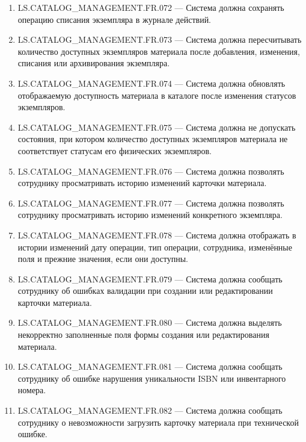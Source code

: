 \documentclass[12pt,a4paper]{article}
\begin{document}
\begin{enumerate}
		\item LS.CATALOG\_MANAGEMENT.FR.072 --- Система должна сохранять операцию списания
		экземпляра в журнале действий.
		
		\item LS.CATALOG\_MANAGEMENT.FR.073 --- Система должна пересчитывать количество
		доступных экземпляров материала после добавления, изменения, списания или
		архивирования экземпляра.
		
		\item LS.CATALOG\_MANAGEMENT.FR.074 --- Система должна обновлять отображаемую
		доступность материала в каталоге после изменения статусов экземпляров.
		
		\item LS.CATALOG\_MANAGEMENT.FR.075 --- Система должна не допускать состояния,
		при котором количество доступных экземпляров материала не соответствует статусам
		его физических экземпляров.
		
		\item LS.CATALOG\_MANAGEMENT.FR.076 --- Система должна позволять сотруднику
		просматривать историю изменений карточки материала.
		
		\item LS.CATALOG\_MANAGEMENT.FR.077 --- Система должна позволять сотруднику
		просматривать историю изменений конкретного экземпляра.
		
		\item LS.CATALOG\_MANAGEMENT.FR.078 --- Система должна отображать в истории
		изменений дату операции, тип операции, сотрудника, изменённые поля и прежние
		значения, если они доступны.
		
		\item LS.CATALOG\_MANAGEMENT.FR.079 --- Система должна сообщать сотруднику об
		ошибках валидации при создании или редактировании карточки материала.
		
		\item LS.CATALOG\_MANAGEMENT.FR.080 --- Система должна выделять некорректно
		заполненные поля формы создания или редактирования материала.
		
		\item LS.CATALOG\_MANAGEMENT.FR.081 --- Система должна сообщать сотруднику об
		ошибке нарушения уникальности ISBN или инвентарного номера.
		
		\item LS.CATALOG\_MANAGEMENT.FR.082 --- Система должна сообщать сотруднику о
		невозможности загрузить карточку материала при технической ошибке.
		

\end{enumerate}
\end{document}
